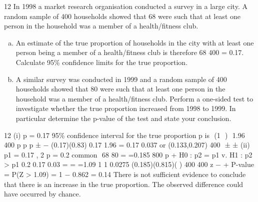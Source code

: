 \documentclass[a4paper,12pt]{article}
\begin{document}
\item 12 In 1998 a market research organisation conducted a survey in a large city. A
random sample of 400 households showed that 68 were such that at least one
person in the household was a member of a health/fitness club.
\begin{enumerate}[(a)]
\item  An estimate of the true proportion of households in the city with at least
one person being a member of a health/fitness club is therefore
68
400
= 0.17. Calculate 95\% confidence limits for the true proportion.
\item A similar survey was conducted in 1999 and a random sample of 400
households showed that 80 were such that at least one person in the
household was a member of a health/fitness club.
Perform a one-sided test to investigate whether the true proportion
increased from 1998 to 1999. In particular determine the p-value of the
test and state your conclusion. 
\end{enumerate}

12 (i) p = 0.17
95\% confidence interval for the true proportion p is
 (1  )  1.96
400
p p
p ± −
(0.17)(0.83)
0.17 1.96 = 0.17 0.037 or (0.133,0.207)
400
 ± ±
(ii) p1 = 0.17 , 2 p = 0.2
common
 68 80 = =0.185
800
p +
H0 : p2 = p1 v. H1 : p2 > p1
0.2 0.17 0.03
= = =1.09
1 1 0.0275
(0.185)(0.815)( )
400 400
z −
+
P-value = P(Z > 1.09) = 1 − 0.862 = 0.14
There is not sufficient evidence to conclude that there is an increase in the
true proportion. The observed difference could have occurred by chance.
\end{document}
